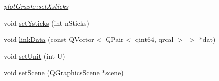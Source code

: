 \begin{DoxyCompactItemize}
\begin{DoxyCompactList}\small\item\em \hyperlink{classplot_graph_ab78b439ee76e1f4df9a9e26ebcd3bc29}{plot\-Graph\-::set\-Xsticks} \end{DoxyCompactList}\item 
void \hyperlink{classplot_graph_af5944ac87c177035eeeaf61d64b1a139}{set\-Ysticks} (int n\-Sticks)
\item 
void \hyperlink{classplot_graph_a8eb89c53d633e0a9574f1670c9c0d644}{link\-Data} (const Q\-Vector$<$ Q\-Pair$<$ qint64, qreal $>$ $>$ $\ast$dat)
\item 
void \hyperlink{classplot_graph_a09a7563bcd8a387e1d9bf3f534ecd990}{set\-Unit} (int U)
\item 
void \hyperlink{classplot_graph_ace55db051cab85e9a0c20795f4c2349a}{set\-Scene} (Q\-Graphics\-Scene $\ast$\hyperlink{classplot_graph_ac35eabe1a0ffbb4379fedebe6d5057c3}{scene})
\end{DoxyCompactItemize}
